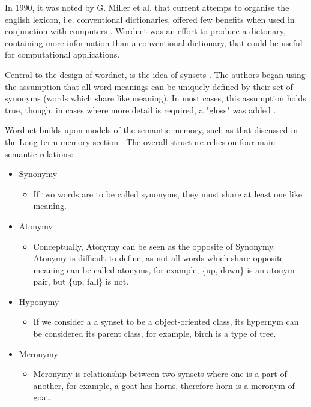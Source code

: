 \documentclass[]{article}
\begin{document}
In 1990, it was noted by G. Miller et al. that current attemps to organise the english lexicon, i.e. conventional dictionaries, offered few benefits when used in conjunction with computers \cite{WN1Introduction}. Wordnet was an effort to produce a dictonary, containing more information than a conventional dictionary, that could be useful for computational applications.

\label{Synsets}Central to the design of wordnet, is the idea of synsets \cite{WN1Introduction}. The authors began using the assumption that all word meanings can be uniquely defined by their set of synonyms (words which share like meaning). In most cases, this assumption holds true, though, in cases where more detail is required, a "gloss" was added \cite{WN1Introduction}.

Wordnet builds upon models of the semantic memory, such as that discussed in the \hyperref[LongTerm]{Long-term memory section} \cite{WN1Introduction}. The overall structure relies on four main semantic relations:

\begin{itemize}
	\item Synonymy
	\begin{itemize}
		\item If two words are to be called synonyms, they must share at least one like meaning.
	\end{itemize}
	
	\item Atonymy \label{Atonym}
	\begin{itemize}
		\item Conceptually, Atonymy can be seen as the opposite of Synonymy. Atonymy is difficult to define, as not all words which share opposite meaning can be called atonyms, for example, \{up, down\} is an atonym pair, but \{up, fall\} is not.
	\end{itemize}
	
	\item Hyponymy \label{Hypernym}
	\begin{itemize}
		\item If we consider a a synset to be a object-oriented class, its hypernym can be considered its parent class, for example, birch is a type of tree.
	\end{itemize}
	
	\item Meronymy \label{Meronym}
	\begin{itemize}
		\item Meronymy is relationship between two synsets where one is a part of another, for example, a goat has horns, therefore horn is a meronym of goat.
	\end{itemize}
	
\end{itemize}
\end{document}
